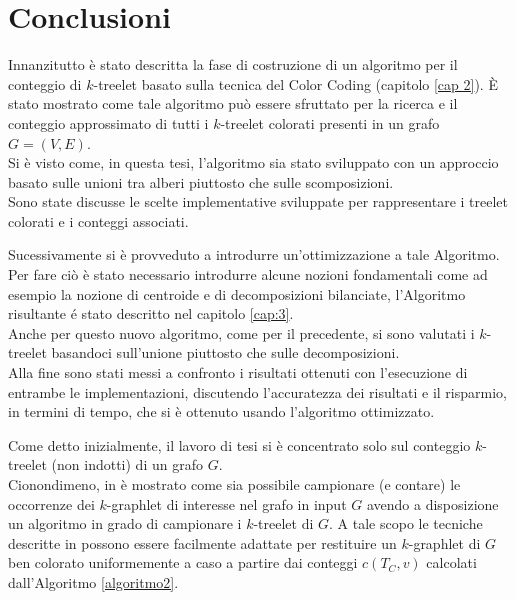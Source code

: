 \chapter{Conclusioni}
Innanzitutto \`e stato descritta la fase di costruzione di un algoritmo per il conteggio di $ k $-treelet basato sulla tecnica del Color Coding (capitolo \ref{cap 2}).
\`E stato mostrato come tale algoritmo pu\`o essere sfruttato per la ricerca e il conteggio approssimato di tutti i $ k $-treelet colorati presenti in un grafo $ G=(V,E) $.\\
Si \`e visto come, in questa tesi, l'algoritmo sia stato sviluppato con un approccio basato sulle unioni tra alberi piuttosto che sulle scomposizioni.\\
Sono state discusse le scelte implementative sviluppate per rappresentare i treelet colorati e i conteggi associati.

Sucessivamente si \`e provveduto a introdurre un'ottimizzazione a tale Algoritmo.\\
Per fare ci\`o \`e stato necessario introdurre alcune nozioni fondamentali come ad esempio la nozione di centroide e di decomposizioni bilanciate, l'Algoritmo risultante \'e stato descritto nel capitolo \ref{cap:3}.\\
Anche per questo nuovo algoritmo, come per il precedente, si sono valutati i $ k $-treelet basandoci sull'unione piuttosto che sulle decomposizioni.\\
Alla fine sono stati messi a confronto i risultati ottenuti con l'esecuzione di entrambe le implementazioni, discutendo l'accuratezza dei risultati e il risparmio, in termini di tempo, che si \`e ottenuto usando l'algoritmo ottimizzato.

Come detto inizialmente, il lavoro di tesi si \`e concentrato solo sul conteggio $ k $-treelet (non indotti) di un grafo $ G $.\\
Cionondimeno, in \cite{bressan2018motif,bressan2019motivo} \`e mostrato come sia possibile campionare (e contare) le occorrenze dei $ k $-graphlet di interesse nel grafo in input $ G $ avendo a disposizione un algoritmo in grado di campionare i $ k $-treelet di $ G $.
A tale scopo le tecniche descritte in \cite{bressan2018motif,bressan2019motivo} possono essere facilmente adattate per restituire un $ k $-graphlet di $ G $ ben colorato uniformemente a caso a partire dai conteggi $ c(T_C,v) $ calcolati dall'Algoritmo \ref{algoritmo2}.

